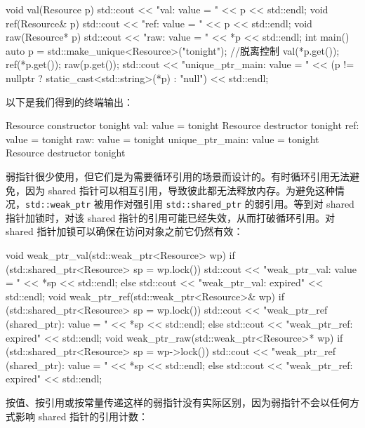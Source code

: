 \begin{codebox}[cpp]
void val(Resource p) {
    std::cout << "val: value = " << p << std::endl;
}
void ref(Resource& p) {
    std::cout << "ref: value = " << p << std::endl;
}
void raw(Resource* p) {
    std::cout << "raw: value = " << *p << std::endl;
}
int main() {
    auto p = std::make_unique<Resource>("tonight");
    //脱离控制
    val(*p.get());
    ref(*p.get());
    raw(p.get());
    std::cout << "unique_ptr_main: value = "
              << (p != nullptr ? static_cast<std::string>(*p) : "null")
              << std::endl;
}
\end{codebox}

以下是我们得到的终端输出：

\begin{codebox}[text]
Resource constructor tonight
val: value = tonight
Resource destructor tonight
ref: value = tonight
raw: value = tonight
unique_ptr_main: value = tonight
Resource destructor tonight
\end{codebox}

\label{idx:459}
弱指针很少使用，但它们是为需要循环引用的场景而设计的。有时循环引用无法避免，因为 shared 指针可以相互引用，导致彼此都无法释放内存。为避免这种情况，\texttt{std::\allowbreak{}weak\_\allowbreak{}ptr} 被用作对强引用 \texttt{std::\allowbreak{}shared\_\allowbreak{}ptr} 的弱引用。等到对 shared 指针加锁时，对该 shared 指针的引用可能已经失效，从而打破循环引用。对 shared 指针加锁可以确保在访问对象之前它仍然有效：

\begin{codebox}[cpp]
void weak_ptr_val(std::weak_ptr<Resource> wp) {
    if (std::shared_ptr<Resource> sp = wp.lock()) {
        std::cout << "weak_ptr_val: value = " << *sp << std::endl;
    } else {
        std::cout << "weak_ptr_val: expired" << std::endl;
    }
}
void weak_ptr_ref(std::weak_ptr<Resource>& wp) {
    if (std::shared_ptr<Resource> sp = wp.lock()) {
        std::cout << "weak_ptr_ref (shared_ptr): value = " << *sp << std::endl;
    } else {
        std::cout << "weak_ptr_ref: expired" << std::endl;
    }
}
void weak_ptr_raw(std::weak_ptr<Resource>* wp) {
    if (std::shared_ptr<Resource> sp = wp->lock()) {
        std::cout << "weak_ptr_ref (shared_ptr): value = " << *sp << std::endl;
    } else {
        std::cout << "weak_ptr_ref: expired" << std::endl;
    }
}
\end{codebox}

\label{idx:460}
按值、按引用或按常量传递这样的弱指针没有实际区别，因为弱指针不会以任何方式影响 shared 指针的引用计数：

